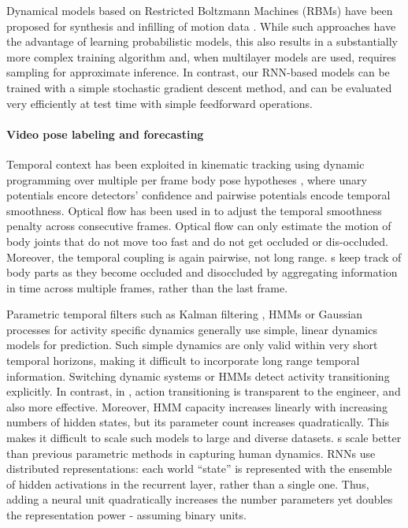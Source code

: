\documentclass[10pt,twocolumn,letterpaper]{article}
\begin{document}
Dynamical models based on Restricted Boltzmann Machines (RBMs) have been proposed for synthesis and infilling of motion data \cite{thr-mhmub-06,sht-rtrbm-08,th-fcrbm-09,DBLP:conf/cvpr/TaylorSFH10}. While such approaches have the advantage of learning probabilistic models, this also results in a substantially more complex training algorithm and, when multilayer models are used, requires sampling for approximate inference. In contrast, our RNN-based models can be trained with a simple stochastic gradient descent method, and can be evaluated very efficiently at test time with simple feedforward operations. 


\paragraph{Video pose labeling and forecasting}
Temporal context has been exploited in kinematic  tracking using  dynamic programming over multiple per frame body pose hypotheses \cite{DBLP:conf/iccv/ParkR11,Batra:2012:DMS:2403138.2403140}, where unary potentials encore detectors' confidence and pairwise potentials encode temporal smoothness. Optical flow has been used  in \cite{conf/cvpr/SappWT11,Sigal:2012:LPE:2205801.2205829} to adjust the temporal smoothness penalty  across consecutive frames. Optical flow can only estimate the motion of body joints that do not move too fast and do not get occluded or dis-occluded. Moreover, the temporal coupling is again pairwise, not long range. s keep track of body parts as they become occluded and disoccluded  by aggregating information  in time across multiple frames, rather than the last frame.  





Parametric  temporal filters such as Kalman filtering \cite{Weng:2006:VOT:1223195.1223208},   
HMMs or  Gaussian processes for activity specific dynamics \cite{Urtasun:2006:PTG:1153170.1153448,unified,Sminchisescu05discriminativedensity}  generally use simple, linear dynamics models for  prediction.  Such simple dynamics are only valid within very short temporal horizons, making it difficult to incorporate long range temporal information. Switching dynamic systems or HMMs \cite{prm-lslmh-00,Fox:IEEESPM2010} detect activity transitioning explicitly. In contrast, in ,  action transitioning  is transparent to the engineer, and also more effective. Moreover, HMM capacity increases linearly with increasing numbers of hidden states, but its parameter count increases quadratically. This makes it difficult to scale such models to large and diverse datasets.  
s scale better than previous parametric methods in capturing human dynamics. RNNs use distributed representations:  each world ``state'' is represented with the ensemble of hidden activations in the recurrent layer, rather than a single one. Thus,  adding a neural unit quadratically increases the number parameters yet  doubles the representation power - assuming binary  units. 
\end{document}
